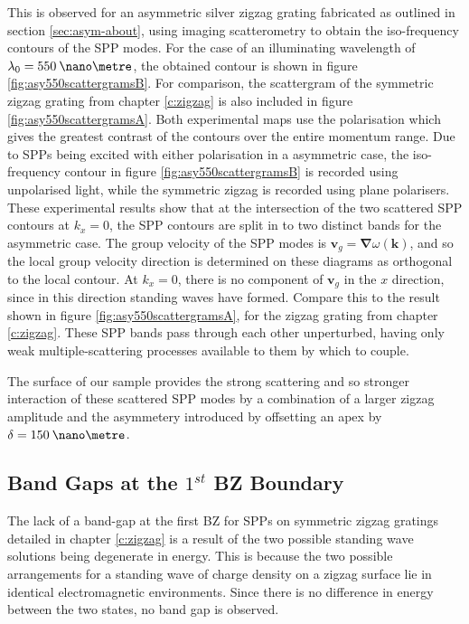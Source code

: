 This is observed for an asymmetric silver zigzag grating fabricated as outlined in section \ref{sec:asym-about}, using imaging scatterometry to obtain the iso-frequency contours of the SPP modes. For the case of an illuminating wavelength of $\lambda_0 = 550\:\nano\metre$, the obtained contour is shown in figure \ref{fig:asy550scattergramsB}. For comparison, the scattergram of the symmetric zigzag grating from chapter \ref{c:zigzag} is also included in figure \ref{fig:asy550scattergramsA}. Both experimental maps use the polarisation which gives the greatest contrast of the contours over the entire momentum range. Due to SPPs being excited with either polarisation in a asymmetric case, the iso-frequency contour in figure \ref{fig:asy550scattergramsB} is recorded using unpolarised light, while the symmetric zigzag is recorded using plane polarisers. These experimental results show that at the intersection of the two scattered SPP contours at $k_x=0$, the SPP contours are split in to two distinct bands for the asymmetric case. The group velocity of the SPP modes is $\mathbf{v}_g=\mathbf{\nabla}\omega(\mathbf{k})$, and so the local group velocity direction is determined on these diagrams as orthogonal to the local contour. At $k_x=0$, there is no component of $\mathbf{v}_g$ in the $x$ direction, since in this direction standing waves  have formed. Compare this to the result shown in figure \ref{fig:asy550scattergramsA}, for the zigzag grating from chapter \ref{c:zigzag}. These SPP bands pass through each other unperturbed, having only weak multiple-scattering processes available to them by which to couple. 

The surface of our sample provides the strong scattering and so stronger interaction of these scattered SPP modes by a combination of a larger zigzag amplitude and the asymmetery introduced by offsetting an apex by $\delta =150\:\nano\metre$.

\subsection{Band Gaps at the $1^{st}$ BZ Boundary}

The lack of a band-gap at the first BZ for SPPs on symmetric zigzag gratings detailed in chapter \ref{c:zigzag} is a result of the two possible standing wave solutions being degenerate in energy. This is because the two possible arrangements for a standing wave of charge density on a zigzag surface lie in identical electromagnetic environments. Since there is no difference in energy between the two states, no band gap is observed.

